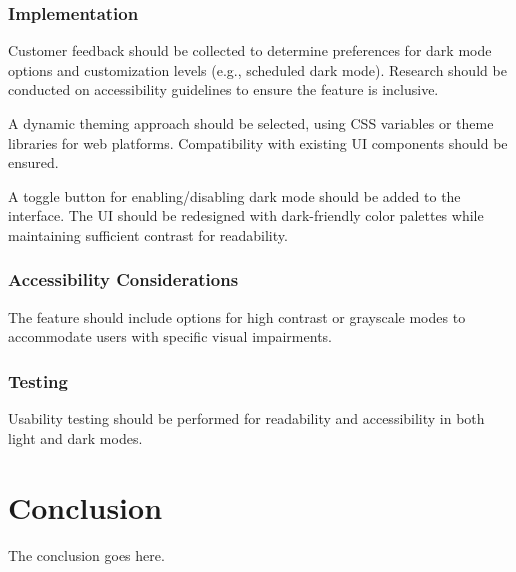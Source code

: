 \documentclass[a4paper,journal]{IEEEtran}
\begin{document}
\subsubsection{Implementation}
Customer feedback should be collected to determine preferences for dark mode
options and customization levels (e.g., scheduled dark mode).
Research should be conducted on accessibility guidelines to ensure the feature
is inclusive.

A dynamic theming approach should be selected, using CSS variables or theme
libraries for web platforms.
Compatibility with existing UI components should be ensured.

A toggle button for enabling/disabling dark mode should be added to the
interface.
The UI should be redesigned with dark-friendly color palettes while maintaining
sufficient contrast for readability.

\subsubsection{Accessibility Considerations}
The feature should include options for high contrast or grayscale modes to
accommodate users with specific visual impairments.

\subsubsection{Testing}
Usability testing should be performed for readability and accessibility in both
light and dark modes.

\section{Conclusion}
The conclusion goes here.






%
\end{document}
